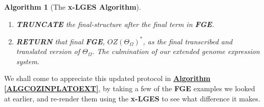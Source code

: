 \documentclass[a4paper, 18pt]{book} %
\newtheorem{alg}{Algorithm}
\begin{document}
\begin{alg}[The \textbf{x-LGES Algorithm}]
\begin{enumerate}
{Then, \textbf{USE} the \textbf{IFA MSS} from \textbf{Step\#1}/\textbf{\hyperref[ALGCOZINPLATO]{Algorithm \ref{ALGCOZINPLATO}}}, that is $\overset{>}{OZ(\Theta_\Omega)}$, as the \textbf{Genome Expression Suffix (GES)} extend the current \textbf{FGE} so that

\begin{equation}
\label{EQTRANSLGENSEQEXT}
\boxed{OZ(\Theta_\Omega)}^* = OZ(\Theta_\Omega)\cdot\boxed{OZ(\Theta_\Omega)}\cdot\overset{>}{OZ(\Theta_\Omega)}
\end{equation}\\

Which, if qualified with the necessary encoding bases is as such:

\begin{equation}
\label{EQTRANSLGENSEQEXTQUAL}
\boxed{OZ(\Theta_\Omega)}^* = OZ(\Theta_\Omega)_{oz}\cdot\boxed{OZ(\Theta_\Omega)}_{pf}\cdot\overset{>}{OZ(\Theta_\Omega)}_{oz}
\end{equation}

And if we express this as the update to \textbf{\hyperref[EQEXTFGEJOINTEXT]{Equation \ref{EQEXTFGEJOINTEXT}}}, we have:

\begin{equation}
		\label{EQEXTFGEJOINTEXT_B}
		\boxed{OZ(\Theta_\Omega)}^* = \boxed{OZ(\Theta_\Omega)}^* \cdot \boxed{\omega_i^*}_{joint} \cdot\overset{>}{OZ(\Theta_\Omega)}_{oz}
		\end{equation}	
		
		Which tells us that the final \textbf{FGE} is the original \textbf{FGE} extended with just one extra JOINT and the \textbf{GES}/\textbf{IFA MSS} encoded in base-OZIN.

}
\item \textbf{TRUNCATE} the final-structure after the final term in \textbf{FGE}.
\item \textbf{RETURN} that final \textbf{FGE}, $\boxed{OZ(\Theta_\Omega)}^*$, as the final transcribed and translated version of $\Theta_\Omega$. The culmination of our extended genome expression system.
\end{enumerate}
\end{alg}


We shall come to appreciate this updated protocol in \textbf{\hyperref[ALGCOZINPLATOEXT]{Algorithm \ref{ALGCOZINPLATOEXT}}}, by taking a few of the \textbf{FGE} examples we looked at earlier, and re-render them using the \textbf{x-LGES} to see what difference it makes.
\end{document}
